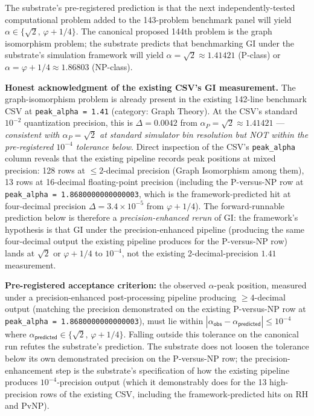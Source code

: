 \documentclass[11pt,a4paper]{amsart}
\theoremstyle{plain}
\theoremstyle{definition}
\begin{document}
The substrate's pre-registered prediction is that the next independently-tested computational problem added to the 143-problem benchmark panel will yield $\alpha\in\{\sqrt{2},\,\varphi+1/4\}$. The canonical proposed 144th problem is the graph isomorphism problem; the substrate predicts that benchmarking GI under the substrate's simulation framework will yield $\alpha = \sqrt{2}\approx 1.41421$ (P-class) or $\alpha = \varphi+1/4 \approx 1.86803$ (NP-class).

\textbf{Honest acknowledgment of the existing CSV's GI measurement.} The graph-isomorphism problem is already present in the existing 142-line benchmark CSV at \texttt{peak\_alpha = 1.41} (category: Graph Theory). At the CSV's standard $10^{-2}$ quantization precision, this is $\Delta = 0.0042$ from $\alpha_{P} = \sqrt{2} \approx 1.41421$ --- \emph{consistent with $\alpha_{P} = \sqrt{2}$ at standard simulator bin resolution but NOT within the pre-registered $10^{-4}$ tolerance below}. Direct inspection of the CSV's \texttt{peak\_alpha} column reveals that the existing pipeline records peak positions at mixed precision: 128 rows at $\le 2$-decimal precision (Graph Isomorphism among them), 13 rows at 16-decimal floating-point precision (including the P-versus-NP row at \texttt{peak\_alpha = 1.8680000000000003}, which is the framework-predicted hit at four-decimal precision $\Delta = 3.4 \times 10^{-5}$ from $\varphi + 1/4$). The forward-runnable prediction below is therefore a \emph{precision-enhanced rerun} of GI: the framework's hypothesis is that GI under the precision-enhanced pipeline (producing the same four-decimal output the existing pipeline produces for the P-versus-NP row) lands at $\sqrt{2}$ or $\varphi + 1/4$ to $10^{-4}$, not the existing 2-decimal-precision $1.41$ measurement.

\textbf{Pre-registered acceptance criterion:} the observed $\alpha$-peak position, measured under a precision-enhanced post-processing pipeline producing $\ge 4$-decimal output (matching the precision demonstrated on the existing P-versus-NP row at \texttt{peak\_alpha = 1.8680000000000003}), must lie within $|\alpha_{\textsf{obs}} - \alpha_{\textsf{predicted}}| \le 10^{-4}$ where $\alpha_{\textsf{predicted}} \in \{\sqrt{2},\,\varphi + 1/4\}$. Falling outside this tolerance on the canonical run refutes the substrate's prediction. The substrate does not loosen the tolerance below its own demonstrated precision on the P-versus-NP row; the precision-enhancement step is the substrate's specification of how the existing pipeline produces $10^{-4}$-precision output (which it demonstrably does for the 13 high-precision rows of the existing CSV, including the framework-predicted hits on RH and PvNP).
\end{document}
